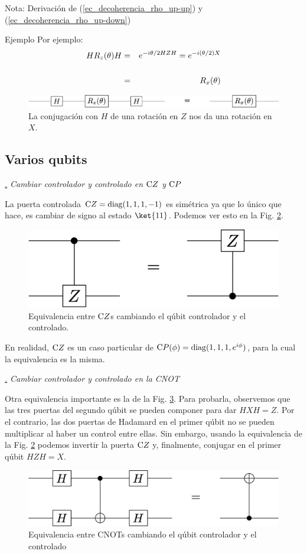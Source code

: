 \documentclass[a4paper,11pt]{book} %
\numberwithin{equation}{chapter}
\newcommand{\cg}[1]{{\rm C}#1}
\def\subsubiContadorIt{\par\addtocounter{subsubsection}{1}\underline{\it\thesubsubsection.}\hskip0.5cm \setcounter{subsubsubsectionIt}{0}}
\newcommand{\SubsubiIt}[1]{
		\subsubiContadorIt \textit{#1}
	}
\newcounter{subsubsubsectionIt}[subsubsection]
\begin{document}
\begin{mybox_blue}{Nota: Derivación de (\ref{ec_decoherencia_rho_up-up}) y  (\ref{ec_decoherencia_rho_up-down})}
	\begin{mybox_green}{Ejemplo}
	Por ejemplo:
	\begin{eqnarray*}
	H R_z(\theta) H &=& e^{-i \theta/2 HZH} =  e^{-i (\theta/2) X} \\ \rule{0mm}{8mm}
	&=& R_x(\theta)
	\end{eqnarray*}
		\begin{figure}[H]
		\centering 
		\includegraphics[width=0.70\linewidth]{Figuras/Fig_elementos_HRzHconjugation}
		\caption{La conjugación con $H$ de una rotación en $Z$ nos da una rotación en $X$.}
		\label{Fig_elementos_HRzHconjugation}
		\end{figure}
	\end{mybox_green}
	

        \subsection{Varios qubits}

			\SubsubiIt{Cambiar controlador y controlado en $\cg{Z}$ y $\cg{P}$}

La puerta  controlada $\cg{Z} =  {\rm diag}(1,1,1,-1)$   es simétrica ya que lo único que hace, es cambiar de signo al estado $\ket{11}$. Podemos ver esto en la Fig. \ref{Fig_elementos_Equiv_Z}.
	\begin{figure}[H]
	\centering 
	\includegraphics[width=0.35\linewidth]{Figuras/Fig_elementos_Equiv_Z}
	\caption{Equivalencia entre $\cg{Z}$s cambiando el qúbit controlador y el controlado.}
	\label{Fig_elementos_Equiv_Z}
	\end{figure}
 En realidad, $\cg{Z}$ es un caso particular de   $\cg{P(\phi)} = {\rm diag} (1,1,1, e^{i\phi})$, para la cual la equivalencia es la misma. 


			\SubsubiIt{Cambiar controlador y controlado en la CNOT} 
			
Otra equivalencia importante es la de la Fig. \ref{Fig_elementos_Equiv_HH}. Para probarla, observemos que las tres puertas del segundo qúbit se pueden componer para dar $HXH=Z$. Por el contrario, las dos puertas de Hadamard en el primer qúbit no se pueden multiplicar al haber un control entre ellas. Sin embargo, usando la  equivalencia de la Fig. \ref{Fig_elementos_Equiv_Z} podemos invertir la puerta $\cg{Z}$ y, finalmente, conjugar en el primer qúbit $HZH=X$.
	\begin{figure}[H]
	\centering 
	\includegraphics[width=0.45\linewidth]{Figuras/Fig_elementos_Equiv_HH}
	\caption{Equivalencia entre CNOTs cambiando el qúbit controlador y el controlado}
	\label{Fig_elementos_Equiv_HH}
	\end{figure}



\end{mybox_blue}
\end{document}
